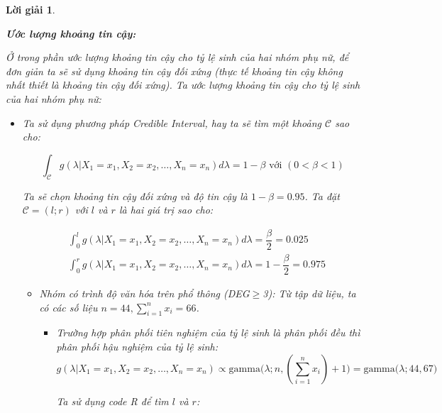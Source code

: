 \documentclass[14pt, a4paper]{article}
\theoremstyle{sltheorem}
\theoremstyle{soltheorem}
\newtheorem*{loigiai}{Lời giải}
\begin{document}
\begin{loigiai}
\begin{enumerate}
        \textbf{Ước lượng khoảng tin cậy:}

        Ở trong phần ước lượng khoảng tin cậy cho tỷ lệ sinh của hai nhóm phụ nữ, để đơn giản ta sẽ sử dụng khoảng tin cậy đối xứng (thực tế khoảng tin cậy không nhất thiết là khoảng tin cậy đối xứng).
        Ta ước lượng khoảng tin cậy cho tỷ lệ sinh của hai nhóm phụ nữ:

        \begin{itemize}
            \item Ta sử dụng phương pháp Credible Interval, hay ta sẽ tìm một khoảng $\mathcal{C}$ sao cho:

        \begin{equation*}
            \int_{\mathcal{C}} g(\lambda \vert X_1 =x_1, X_2=x_2, \dots, X_n=x_n) d\lambda = 1 - \beta \text{ với } (0 < \beta < 1)
        \end{equation*}

        Ta sẽ chọn khoảng tin cậy đối xứng và độ tin cậy là $1-\beta=0.95$.
        Ta đặt $\mathcal{C}=(l;r)$ với $l$ và $r$ là hai giá trị sao cho:

        \begin{equation*}
            \begin{aligned}
                &\int_{0}^l g(\lambda \vert X_1 =x_1, X_2=x_2, \dots, X_n=x_n) d\lambda = \dfrac{\beta}{2}=0.025 \\
                &\int_{0}^r g(\lambda \vert X_1 =x_1, X_2=x_2, \dots, X_n=x_n) d\lambda = 1-\dfrac{\beta}{2}=0.975
            \end{aligned}
        \end{equation*}

        \begin{itemize}
            \item Nhóm có trình độ văn hóa trên phổ thông (DEG$\geq$3):
            Từ tập dữ liệu, ta có các số liệu $n=44, \sum_{i=1}^n x_i=66$.
            \begin{itemize}
                \item Trường hợp phân phối tiên nghiệm của tỷ lệ sinh là phân phối đều thì phân phối hậu nghiệm của tỷ lệ sinh:
                \begin{equation*}
                    g(\lambda \vert X_1 =x_1, X_2=x_2, \dots, X_n=x_n) \propto \text{gamma}\big(\lambda; n, (\sum_{i=1}^n x_i) + 1\big) = \text{gamma}\big(\lambda; 44, 67\big)
                \end{equation*}

                Ta sử dụng code R để tìm $l$ và $r$:


\end{itemize}
\end{itemize}
\end{itemize}
\end{enumerate}
\end{loigiai}
\end{document}
